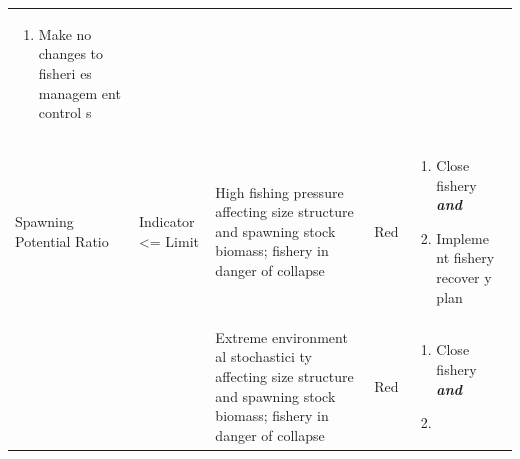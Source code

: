 \documentclass[]{book}
\providecommand{\tightlist}{%
  \setlength{\itemsep}{0pt}\setlength{\parskip}{0pt}}
\begin{document}
\begin{longtable}[]{@{}lllll@{}}
\begin{minipage}[t]{0.19\columnwidth}
\begin{enumerate}
\def\labelenumi{\arabic{enumi}.}
\tightlist
\item
  Make no changes to fisheri es managem ent control s
\end{enumerate}\strut
\end{minipage}\tabularnewline
\begin{minipage}[t]{0.19\columnwidth}\raggedright\strut
Spawning Potential Ratio\strut
\end{minipage} & \begin{minipage}[t]{0.19\columnwidth}\raggedright\strut
Indicator \textless{}= Limit\strut
\end{minipage} & \begin{minipage}[t]{0.19\columnwidth}\raggedright\strut
High fishing pressure affecting size structure and spawning stock
biomass; fishery in danger of collapse\strut
\end{minipage} & \begin{minipage}[t]{0.19\columnwidth}\raggedright\strut
Red\strut
\end{minipage} & \begin{minipage}[t]{0.19\columnwidth}\raggedright\strut
\begin{enumerate}
\def\labelenumi{\arabic{enumi}.}
\item
  Close fishery \textbf{\emph{and} }
\item
  Impleme nt fishery recover y plan
\end{enumerate}\strut
\end{minipage}\tabularnewline
\begin{minipage}[t]{0.19\columnwidth}\raggedright\strut
\strut
\end{minipage} & \begin{minipage}[t]{0.19\columnwidth}\raggedright\strut
\strut
\end{minipage} & \begin{minipage}[t]{0.19\columnwidth}\raggedright\strut
Extreme environment al stochastici ty affecting size structure and
spawning stock biomass; fishery in danger of collapse\strut
\end{minipage} & \begin{minipage}[t]{0.19\columnwidth}\raggedright\strut
Red\strut
\end{minipage} & \begin{minipage}[t]{0.19\columnwidth}\raggedright\strut
\begin{enumerate}
\def\labelenumi{\arabic{enumi}.}
\item
  Close fishery \textbf{\emph{and} }
\item

\end{enumerate}
\end{minipage}
\end{longtable}
\end{document}
